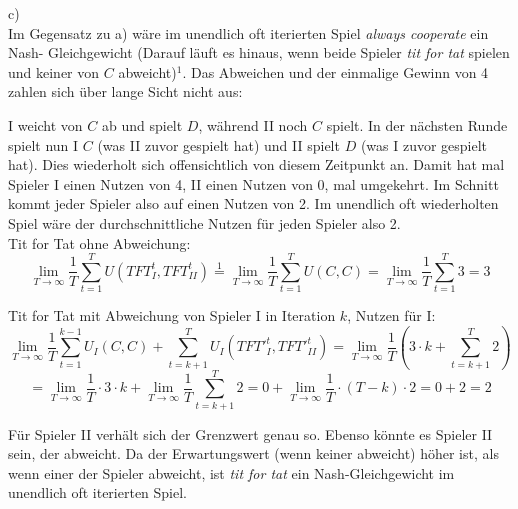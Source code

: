 \documentclass{scrartcl}
\begin{document}
c) \\

Im Gegensatz zu a) wäre im unendlich oft iterierten Spiel \textsl{always cooperate} ein Nash-
Gleichgewicht (Darauf läuft es hinaus, wenn beide Spieler \textsl{tit for tat} spielen und keiner
von $C$ abweicht)$^1$. Das Abweichen und der einmalige Gewinn von 4 zahlen sich über lange Sicht
nicht aus:

I weicht von $C$ ab und spielt $D$, während II noch $C$ spielt. In der nächsten Runde spielt
nun I $C$ (was II zuvor gespielt hat) und II spielt $D$ (was I zuvor gespielt hat). Dies
wiederholt sich offensichtlich von diesem Zeitpunkt an. Damit hat mal Spieler I einen Nutzen von
4, II einen Nutzen von 0, mal umgekehrt. Im Schnitt kommt jeder Spieler also auf einen Nutzen
von 2. Im unendlich oft wiederholten Spiel wäre der durchschnittliche Nutzen für jeden Spieler
also 2. \\

Tit for Tat ohne Abweichung: \\

\[
\lim_{T \to \infty} \frac{1}{T} \sum_{t=1}^{T} U(TFT^t_I, TFT^t_{II}) \overset{1}= \lim_{T \to \infty} 
\frac{1}{T} \sum_{t=1}^{T} U(C, C) = \lim_{T \to \infty} \frac{1}{T} \sum_{t=1}^{T} 3 = 3
\]

Tit for Tat mit Abweichung von Spieler I in Iteration $k$, Nutzen für I: \\

\[
\lim_{T \to \infty} \frac{1}{T} \sum_{t=1}^{k-1} U_I(C, C) + \sum_{t = k+1}^{T}
U_I(TFT'^t_I, TFT'^t_{II}) = \lim_{T \to \infty} \frac{1}{T} ( 3 \cdot k + \sum_{t = k+1}^{T}
2)
\]
\[
= \lim_{T \to \infty} \frac{1}{T} \cdot 3 \cdot k + \lim_{T \to \infty} \frac{1}{T}
\sum_{t = k+1}^{T} 2 = 0 + \lim_{T \to \infty} \frac{1}{T} \cdot (T - k) \cdot 2 = 0 + 2 = 2
\]

Für Spieler II verhält sich der Grenzwert genau so. Ebenso könnte es Spieler II sein, der abweicht.
Da der Erwartungswert (wenn keiner abweicht) höher ist, als wenn einer der Spieler abweicht, ist
\textsl{tit for tat} ein Nash-Gleichgewicht im unendlich oft iterierten Spiel.
\end{document}
